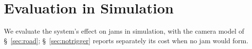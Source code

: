 \section{Evaluation in Simulation}
\label{sec:eval}

We evaluate the system's effect on jams in simulation, with the camera model of \S~\ref{sec:road}; \S~\ref{sec:notrigger} reports separately its cost when no jam would form.


